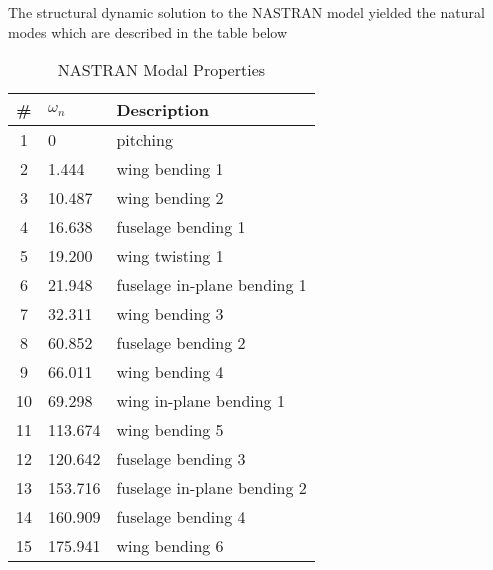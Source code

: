 The structural dynamic solution to the NASTRAN model yielded the natural modes which are described in the table below
\begin{table}[H]
	\centering
	\label{tab:nastranResult}
	\caption{NASTRAN Modal Properties}
	\begin{tabular}{cll}
		\hline\hline
		\# & $\omega_n$ & Description \\
		\hline
		1  &   0     & pitching \\
		2  &   1.444 & wing bending 1 \\
		3  &  10.487 & wing bending 2 \\
		4  &  16.638 & fuselage bending 1 \\
		5  &  19.200 & wing twisting 1 \\
		6  &  21.948 & fuselage in-plane bending 1 \\
		7  &  32.311 & wing bending 3 \\
		8  &  60.852 & fuselage bending 2 \\
		9  &  66.011 & wing bending 4 \\
		10 &  69.298 & wing in-plane bending 1 \\
		11 & 113.674 & wing bending 5 \\
		12 & 120.642 & fuselage bending 3 \\
		13 & 153.716 & fuselage in-plane bending 2  \\
		14 & 160.909 & fuselage bending 4 \\
		15 & 175.941 & wing bending 6 \\
		\hline\hline
	\end{tabular}
\end{table}